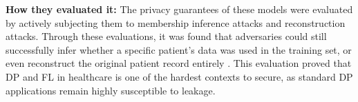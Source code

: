 \documentclass[letterpaper]{article}
\begin{document}
\textbf{How they evaluated it:} The privacy guarantees of these models were evaluated by actively subjecting them to membership inference attacks and reconstruction attacks. Through these evaluations, it was found that adversaries could still successfully infer whether a specific patient’s data was used in the training set, or even reconstruct the original patient record entirely \parencite{teo2024}. This evaluation proved that DP and FL in healthcare is one of the hardest contexts to secure, as standard DP applications remain highly susceptible to leakage.

\newpage
\section{}

\printbibliography[title={References}]
\end{document}
